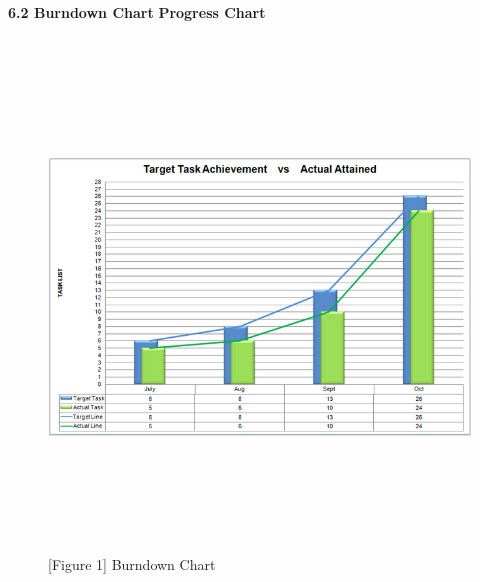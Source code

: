 \documentclass[29pt,a4paper]{moderncv}
\begin{document}
\newpage
		\noindent\textbf{6.2 Burndown Chart}
		\noindent\textbf{Progress Chart}
		\begin{figure}
			\centering
			\\ \includegraphics[width=6.0in, height=5.0in]{./chart.png}
			\\\caption{[Figure 1] Burndown Chart}
		\end{figure}\\
		
\end{document}

